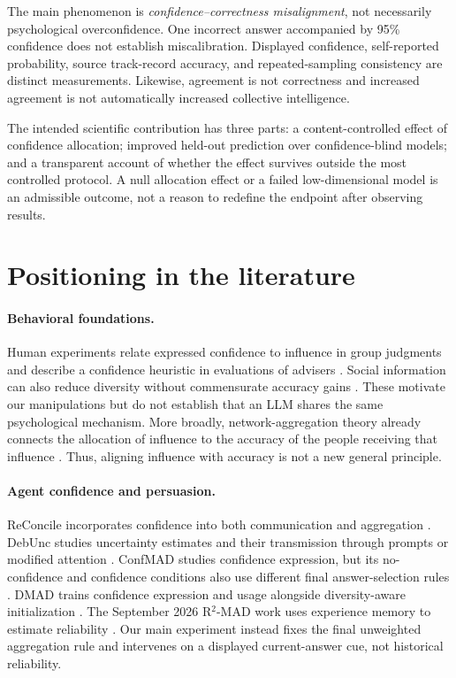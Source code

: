 \documentclass[11pt]{article}
\begin{document}
The main phenomenon is \emph{confidence--correctness misalignment}, not necessarily psychological overconfidence. One incorrect answer accompanied by 95\% confidence does not establish miscalibration. Displayed confidence, self-reported probability, source track-record accuracy, and repeated-sampling consistency are distinct measurements. Likewise, agreement is not correctness and increased agreement is not automatically increased collective intelligence.

The intended scientific contribution has three parts: a content-controlled effect of confidence allocation; improved held-out prediction over confidence-blind models; and a transparent account of whether the effect survives outside the most controlled protocol. A null allocation effect or a failed low-dimensional model is an admissible outcome, not a reason to redefine the endpoint after observing results.

\section{Positioning in the literature}
\label{sec:literature}
\paragraph{Behavioral foundations.}
Human experiments relate expressed confidence to influence in group judgments \citep{zarnoth1997confidence} and describe a confidence heuristic in evaluations of advisers \citep{price2004heuristic}. Social information can also reduce diversity without commensurate accuracy gains \citep{lorenz2011wisdom}. These motivate our manipulations but do not establish that an LLM shares the same psychological mechanism. More broadly, network-aggregation theory already connects the allocation of influence to the accuracy of the people receiving that influence \citep{tian2022wisdom,almaatouq2020wisdom}. Thus, aligning influence with accuracy is not a new general principle.

\paragraph{Agent confidence and persuasion.}
ReConcile incorporates confidence into both communication and aggregation \citep{chen2023reconcile}. DebUnc studies uncertainty estimates and their transmission through prompts or modified attention \citep{yoffe2024debunc}. ConfMAD studies confidence expression, but its no-confidence and confidence conditions also use different final answer-selection rules \citep{lin2025confmad}. DMAD trains confidence expression and usage alongside diversity-aware initialization \citep{zhu2026demystifying}. The September 2026 R$^2$-MAD work uses experience memory to estimate reliability \citep{jin2026remember}. Our main experiment instead fixes the final unweighted aggregation rule and intervenes on a displayed current-answer cue, not historical reliability.
\end{document}
